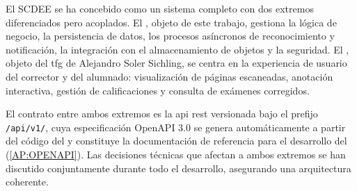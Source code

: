 El SCDEE se ha concebido como un sistema completo con dos extremos
diferenciados pero acoplados. El , objeto de este trabajo,
gestiona la lógica de negocio, la persistencia de datos, los procesos
asíncronos de reconocimiento y notificación, la integración con el
almacenamiento de objetos y la seguridad. El , objeto del
\acs{tfg} de Alejandro Soler Sichling, se centra en la experiencia de
usuario del corrector y del alumnado: visualización de páginas
escaneadas, anotación interactiva, gestión de calificaciones y consulta de
exámenes corregidos.

El contrato entre ambos extremos es la \ac{api} \ac{rest} versionada bajo
el prefijo \texttt{/api/v1/}, cuya especificación OpenAPI 3.0 se genera
automáticamente a partir del código del  y constituye la
documentación de referencia para el desarrollo del 
(\cref{AP:OPENAPI}). Las decisiones técnicas que afectan a ambos extremos
se han discutido conjuntamente durante todo el desarrollo, asegurando una
arquitectura coherente.
